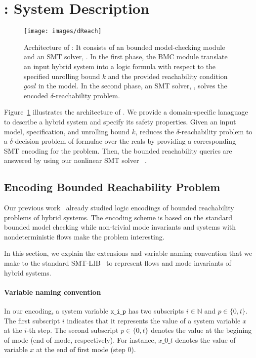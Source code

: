 \section{\dReach{}: System Description}\label{sec:system}
\begin{figure}
  \centering
  \texttt{[image: images/dReach]}
  \caption{Architecture of \dReach{}: It consists of an bounded
    model-checking module and an SMT solver, \dReal{}. In the first
    phase, the BMC module translate an input hybrid system into a
    logic formula with respect to the specified unrolling bound $k$
    and the provided reachability condition $\textit{goal}$ in the
    model. In the second phase, an SMT solver, \dReal{}, solves the
    encoded $\delta$-reachability problem.}
  \label{fig:system-description}
\end{figure}

Figure~\ref{fig:system-description} illustrates the architecture of
\dReach{}. We provide a domain-specific lanaguage to describe a hybrid
system and specify its safety properties. Given an input model,
specification, and unrolling bound $k$, \dReach{} reduces the
$\delta$-reachability problem to a $\delta$-decision problem of
formulae over the reals by providing a corresponding SMT encoding for
the problem. Then, the bounded reachability queries are answered by
using our nonlinear SMT solver \dReal{}~\cite{DBLP:conf/cade/GaoKC13}.

\subsection{Encoding Bounded Reachability Problem}

Our previous work~\cite{DBLP:journals/corr/GaoKCC14} already studied
logic encodings of bounded reachability problems of hybrid
systems. The encoding scheme is based on the standard bounded model
checking while non-trivial mode invariants and systems with
nondeterministic flows make the problem interesting.

In this section, we explain the extensions and variable naming
convention that we make to the standard SMT-LIB~\cite{BarST-SMT-10} to
represent flows and mode invariants of hybrid systems.

\paragraph{Variable naming convention}
In our encoding, a system variable $\texttt{x\_i\_p}$ has two
subscripts $i \in \mathbb{N}$ and $p \in \{0, t\}$. The first
subscript $i$ indicates that it represents the value of a system
variable $x$ at the $i$-th step. The second subscript $p \in \{0, t\}$
denotes the value at the begining of mode (end of mode,
respectively). For instance, $x\_0\_t$ denotes the value of variable
$x$ at the end of first mode (step 0).

